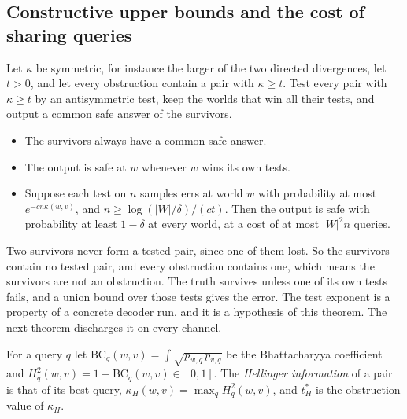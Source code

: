 \subsection{Constructive upper bounds and the cost of sharing queries}
\begin{theorem}
\label{thm:upper}
Let $\kappa$ be symmetric, for instance the larger of the two directed divergences, let
$t>0$, and let every obstruction contain a pair with $\kappa\ge t$. Test every pair with $\kappa\ge t$ by
an antisymmetric test, keep the worlds that win all their tests, and output a common safe
answer of the survivors.
\begin{itemize}
\item The survivors always have a common safe answer.
\item The output is safe at $w$ whenever $w$ wins its own tests.
\item Suppose each test on $n$ samples errs at world $w$ with probability at most
$e^{-cn\kappa(w,v)}$, and $n\ge\log(|W|/\delta)/(ct)$. Then the output is safe with probability
at least $1-\delta$ at every world, at a cost of at most $|W|^{2}n$ queries.
\end{itemize}
\end{theorem}


Two survivors never form a tested pair, since one of them lost. So the survivors contain no
tested pair, and every obstruction contains one, which means the survivors are not an
obstruction. The truth survives unless one of its own tests fails, and a union bound over those
tests gives the error. The test exponent is a property of a concrete decoder run, and it is a
hypothesis of this theorem. The next theorem discharges it on every channel.

For a query $q$ let $\mathrm{BC}_{q}(w,v)=\int\sqrt{p_{w,q}\,p_{v,q}}$ be the Bhattacharyya
coefficient and $H^{2}_{q}(w,v)=1-\mathrm{BC}_{q}(w,v)\in[0,1]$. The \emph{Hellinger
information} of a pair is that of its best query, $\kappa_{H}(w,v)=\max_{q}H^{2}_{q}(w,v)$, and
$t^{*}_{H}$ is the obstruction value of $\kappa_{H}$.

